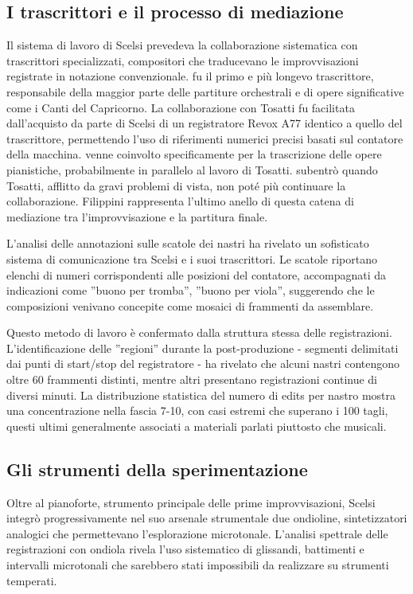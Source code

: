 \subsection{I trascrittori e il processo di mediazione}
Il sistema di lavoro di Scelsi prevedeva la collaborazione sistematica con trascrittori specializzati, compositori che traducevano le improvvisazioni registrate in notazione convenzionale.
 fu il primo e più longevo trascrittore, responsabile della maggior parte delle partiture orchestrali e di opere significative come i Canti del Capricorno. La collaborazione con Tosatti fu facilitata dall'acquisto da parte di Scelsi di un registratore Revox A77 identico a quello del trascrittore, permettendo l'uso di riferimenti numerici precisi basati sul contatore della macchina.  venne coinvolto specificamente per la trascrizione delle opere pianistiche, probabilmente in parallelo al lavoro di Tosatti.  subentrò quando Tosatti, afflitto da gravi problemi di vista, non poté più continuare la collaborazione. Filippini rappresenta l'ultimo anello di questa catena di mediazione tra l'improvvisazione e la partitura finale.

L'analisi delle annotazioni sulle scatole dei nastri ha rivelato un sofisticato sistema di comunicazione tra Scelsi e i suoi trascrittori. Le scatole riportano elenchi di numeri corrispondenti alle posizioni del contatore, accompagnati da indicazioni come ''buono per tromba'', ''buono per viola'', suggerendo che le composizioni venivano concepite come mosaici di frammenti da assemblare.

Questo metodo di lavoro è confermato dalla struttura stessa delle registrazioni. L'identificazione delle ''regioni'' durante la post-produzione - segmenti delimitati dai punti di start/stop del registratore - ha rivelato che alcuni nastri contengono oltre 60 frammenti distinti, mentre altri presentano registrazioni continue di diversi minuti\cite[p. 49]{Bernardini2020Quanti}. La distribuzione statistica del numero di edits per nastro mostra una concentrazione nella fascia 7-10, con casi estremi che superano i 100 tagli, questi ultimi generalmente associati a materiali parlati piuttosto che musicali\cite[p. 49]{Bernardini2020Quanti}.
\subsection{Gli strumenti della sperimentazione}
Oltre al pianoforte, strumento principale delle prime improvvisazioni, Scelsi integrò progressivamente nel suo arsenale strumentale due ondioline, sintetizzatori analogici che permettevano l'esplorazione microtonale\cite[p. 177]{Bernardini2020Quanti}. L'analisi spettrale delle registrazioni con ondiola rivela l'uso sistematico di glissandi, battimenti e intervalli microtonali che sarebbero stati impossibili da realizzare su strumenti temperati.

